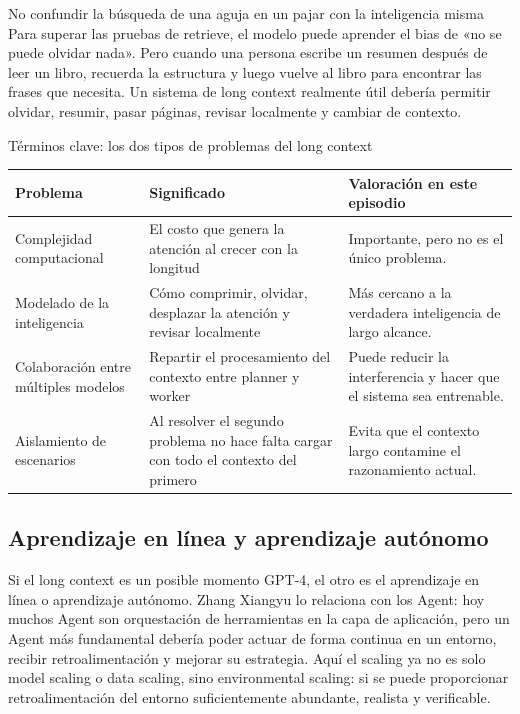 \begin{warningbox}{No confundir la búsqueda de una aguja en un pajar con la inteligencia misma}
Para superar las pruebas de retrieve, el modelo puede aprender el bias de «no se puede olvidar nada». Pero cuando una persona escribe un resumen después de leer un libro, recuerda la estructura y luego vuelve al libro para encontrar las frases que necesita. Un sistema de long context realmente útil debería permitir olvidar, resumir, pasar páginas, revisar localmente y cambiar de contexto.
\end{warningbox}

\begin{knowledgebox}{Términos clave: los dos tipos de problemas del long context}
\noindent\begin{tabularx}{\textwidth}{p{}p{}X}
\toprule
Problema & Significado & Valoración en este episodio \\
\midrule
Complejidad computacional & El costo que genera la atención al crecer con la longitud & Importante, pero no es el único problema. \\
Modelado de la inteligencia & Cómo comprimir, olvidar, desplazar la atención y revisar localmente & Más cercano a la verdadera inteligencia de largo alcance. \\
Colaboración entre múltiples modelos & Repartir el procesamiento del contexto entre planner y worker & Puede reducir la interferencia y hacer que el sistema sea entrenable. \\
Aislamiento de escenarios & Al resolver el segundo problema no hace falta cargar con todo el contexto del primero & Evita que el contexto largo contamine el razonamiento actual. \\
\bottomrule
\end{tabularx}
\end{knowledgebox}

\subsection{Aprendizaje en línea y aprendizaje autónomo}

Si el long context es un posible momento GPT-4, el otro es el aprendizaje en línea o aprendizaje autónomo. Zhang Xiangyu lo relaciona con los Agent: hoy muchos Agent son orquestación de herramientas en la capa de aplicación, pero un Agent más fundamental debería poder actuar de forma continua en un entorno, recibir retroalimentación y mejorar su estrategia. Aquí el scaling ya no es solo model scaling o data scaling, sino environmental scaling: si se puede proporcionar retroalimentación del entorno suficientemente abundante, realista y verificable.

